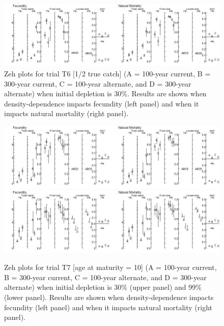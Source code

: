 \documentclass{article}\usepackage[]{graphicx}\usepackage[]{color}
\providecommand\phantomsection{}
\begin{document}
\begin{landscape}
\phantomsection
{}
\setcounter{figure}{0}


\begin{figure}[H]
\centering
\includegraphics[]{SC66aRMP10_Part2_T6-R.jpeg}
\caption{
Zeh plots for trial T6
[1/2 true catch]
(A = 100-year current, B = 300-year current, C = 100-year alternate, and D = 300-year alternate)
when initial depletion is 30\%.
Results are shown when density-dependence impacts fecundity (left panel) and when it impacts natural mortality (right panel).
}
\end{figure}

\phantomsection
{}
\setcounter{figure}{0}


\begin{figure}[H]
\centering
\includegraphics[]{SC66aRMP10_Part2_T7-R.jpeg}
\includegraphics[]{SC66aRMP10_Part2_T7-D.jpeg}
\caption{
Zeh plots for trial T7
[age at maturity = 10]
(A = 100-year current, B = 300-year current, C = 100-year alternate, and D = 300-year alternate)
when initial depletion is 30\% (upper panel) and 99\% (lower panel).
Results are shown when density-dependence impacts fecundity (left panel) and when it impacts natural mortality (right panel).
}
\end{figure}


\end{landscape}
\end{document}

